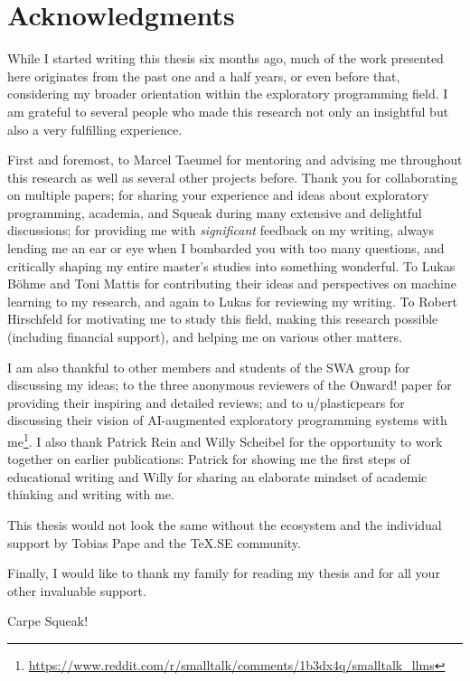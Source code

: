
\begingroup
\let\raggedsection\centering

\chapter*{Acknowledgments}
\label{cha:acknowledgments}
\endgroup
\begin{quoting}[leftmargin=2em,rightmargin=2em]
	\noindent
	While I started writing this thesis six months ago, much of the work presented here originates from the past one and a half years, or even before that, considering my broader orientation within the exploratory programming field.
	I am grateful to several people who made this research not only an insightful but also a very fulfilling experience.

	First and foremost, to Marcel Taeumel for mentoring and advising me throughout this research as well as several other projects before. Thank you for collaborating on multiple papers; for sharing your experience and ideas about exploratory programming, academia, and Squeak during many extensive and delightful discussions; for providing me with \emph{significant} feedback on my writing, always lending me an ear or eye when I bombarded you with too many questions, and critically shaping my entire master's studies into something wonderful.
	To Lukas Böhme and Toni Mattis for contributing their ideas and perspectives on machine learning to my research, and again to Lukas for reviewing my writing.
	To Robert Hirschfeld for motivating me to study this field, making this research possible (including financial support), and helping me on various other matters.

	I am also thankful to other members and students of the SWA group for discussing my ideas; to the three anonymous reviewers of the Onward! paper for providing their inspiring and detailed reviews; and to u/plasticpears for discussing their vision of AI-augmented exploratory programming systems with me\footnote{\url{https://www.reddit.com/r/smalltalk/comments/1b3dx4q/smalltalk_llms}}.
	I also thank Patrick Rein and Willy Scheibel for the opportunity to work together on earlier publications: Patrick for showing me the first steps of educational writing and Willy for sharing an elaborate mindset of academic thinking and writing with me.

	This thesis would not look the same without the ecosystem and the individual support by Tobias Pape and the \TeX.SE community.

	Finally, I would like to thank my family for reading my thesis and for all your other invaluable support.

	\bigskip

	Carpe Squeak!
\end{quoting}
